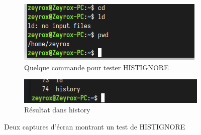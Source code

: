 \documentclass[12pt]{article}
\begin{document}
\begin{figure}[h]
  \centering
  \begin{subfigure}{0.45\textwidth}
    \centering
    \includegraphics[width=\textwidth]{Image-TD-4/commande_test.png}
    \caption{Quelque commande pour tester HISTIGNORE}
  \end{subfigure}
  \vspace{0.9cm} %
  \begin{subfigure}{0.45\textwidth}
    \centering
    \includegraphics[width=\textwidth]{Image-TD-4/history1.png}
    \caption{Résultat dans history}
  \end{subfigure}
  \caption{Deux captures d'écran montrant un test de HISTIGNORE}
\end{figure}
\end{document}
